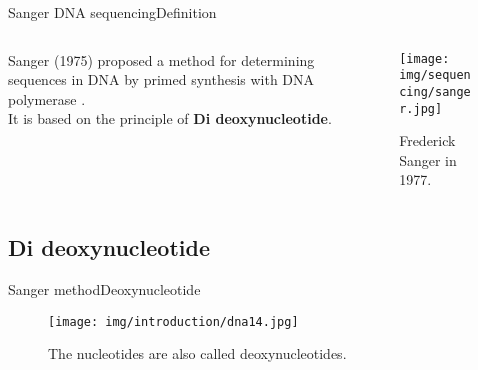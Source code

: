 \documentclass[10pt]{beamer}
\newcommand{\1}{
	\setbeamertemplate{background}{
		\texttt{[image: img/1]}
		\tikz[overlay] \fill[fill opacity=0.75,fill=white] (0,0) rectangle (-\paperwidth,\paperheight);
	}
}
\begin{document}
\begin{frame}{Sanger DNA sequencing}{Definition}
	
		\begin{columns}
			\begin{column}{0.48\textwidth}
				\begin{block}{}
					Sanger (1975) proposed a method for determining sequences in DNA by primed synthesis with DNA polymerase \cite{sanger1977dna}. \\ 
					It is based on the principle of \textbf{Di deoxynucleotide}.
				\end{block} 
			\end{column}
			\begin{column}{0.48\textwidth}
				\begin{figure}[]
					\centering
					\texttt{[image: img/sequencing/sanger.jpg]}
					\label{img:mot2}
					\caption{Frederick Sanger in 1977.}
				\end{figure}
			\end{column}
		\end{columns}	
\end{frame}

\subsection{Di deoxynucleotide}


\begin{frame}{Sanger method}{Deoxynucleotide}
	\begin{figure}[]
		\centering
		\texttt{[image: img/introduction/dna14.jpg]}
		\label{img:mot2}
		\caption{The nucleotides are also called deoxynucleotides.}
	\end{figure}
\end{frame}
\end{document}
